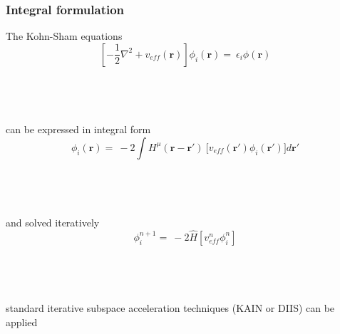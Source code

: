 \begin{frame}
    \frametitle{Integral formulation}
    \centering
    The Kohn-Sham equations
    \begin{equation}
	\nonumber
	\left[-\frac{1}{2}\nabla^2 + v_{eff}(\boldsymbol{r})\right]
	\phi_i(\boldsymbol{r}) =\ \epsilon_i \phi(\boldsymbol{r})
    \end{equation}
    \ \\
    \ \\
    \ \\
    \ \\
    \pause
    can be expressed in integral form
    \begin{equation}
	\nonumber
	\phi_i(\boldsymbol{r}) =\ -2\int H^{\mu}(\boldsymbol{r}-\boldsymbol{r}')\
	    \Big[v_{eff}(\boldsymbol{r}') \phi_i(\boldsymbol{r}')\Big] d\boldsymbol{r}'
    \end{equation}
    \ \\
    \ \\
    \ \\
    \ \\
    \pause
    and solved iteratively
    \begin{equation}
	\nonumber
	\phi_i^{n+1} =\ -2\hat{H}\left[v_{eff}^n\phi_i^n\right]
    \end{equation}
    \ \\
    \ \\
    \ \\
    \ \\
    standard iterative subspace acceleration techniques (KAIN or DIIS) can be applied
\end{frame}

